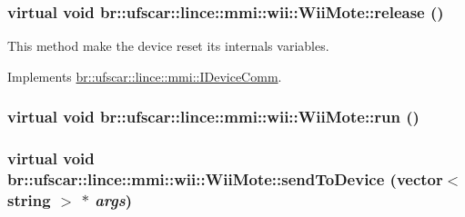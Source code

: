 \label{classbr_1_1ufscar_1_1lince_1_1mmi_1_1wii_1_1WiiMote_a1eeed1b89ee5cd55fedf9f8c75561ed0}
\hypertarget{classbr_1_1ufscar_1_1lince_1_1mmi_1_1wii_1_1WiiMote_a4d17da2514583aa3787a1d9fda1cd74c}{
\subsubsection[{release}]{\setlength{\rightskip}{0pt plus 5cm}virtual void br::ufscar::lince::mmi::wii::WiiMote::release ()}}
\label{classbr_1_1ufscar_1_1lince_1_1mmi_1_1wii_1_1WiiMote_a4d17da2514583aa3787a1d9fda1cd74c}


This method make the device reset its internals variables. 



Implements \hyperlink{classbr_1_1ufscar_1_1lince_1_1mmi_1_1IDeviceComm_a9c173ebb83a502e78143a52fc7d87a80}{br::ufscar::lince::mmi::IDeviceComm}.

\hypertarget{classbr_1_1ufscar_1_1lince_1_1mmi_1_1wii_1_1WiiMote_ae0f3e542c2d18e7a09c2beb09562a7d4}{
\subsubsection[{run}]{\setlength{\rightskip}{0pt plus 5cm}virtual void br::ufscar::lince::mmi::wii::WiiMote::run ()}}
\label{classbr_1_1ufscar_1_1lince_1_1mmi_1_1wii_1_1WiiMote_ae0f3e542c2d18e7a09c2beb09562a7d4}
\hypertarget{classbr_1_1ufscar_1_1lince_1_1mmi_1_1wii_1_1WiiMote_acd1fe851dd5909ee3cbd0fa23a070f0e}{
\subsubsection[{sendToDevice}]{\setlength{\rightskip}{0pt plus 5cm}virtual void br::ufscar::lince::mmi::wii::WiiMote::sendToDevice (vector$<$ string $>$ $\ast$ {\em args})}}
\label{classbr_1_1ufscar_1_1lince_1_1mmi_1_1wii_1_1WiiMote_acd1fe851dd5909ee3cbd0fa23a070f0e}



